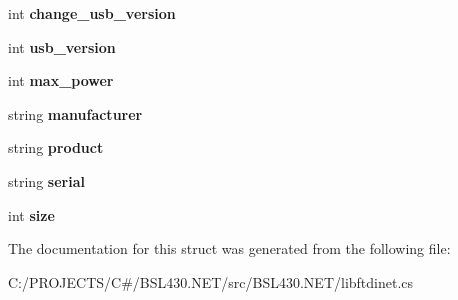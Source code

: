 \begin{DoxyCompactItemize}
int {\bfseries change\+\_\+usb\+\_\+version}
\item 
\mbox{\label{structlibftdinet_1_1ftdi__eeprom_a6b5046d7b6ed9dce4349c097d8554bc6}} 
int {\bfseries usb\+\_\+version}
\item 
\mbox{\label{structlibftdinet_1_1ftdi__eeprom_acb1695d25aba40e0a7f08085e620d5eb}} 
int {\bfseries max\+\_\+power}
\item 
\mbox{\label{structlibftdinet_1_1ftdi__eeprom_a097cd6cb98a7950a6ae847bd2f7641db}} 
string {\bfseries manufacturer}
\item 
\mbox{\label{structlibftdinet_1_1ftdi__eeprom_ac5adb9a236be5b92ab54cdc2ad74884a}} 
string {\bfseries product}
\item 
\mbox{\label{structlibftdinet_1_1ftdi__eeprom_a400ff6e7d05f656644b6139fd400577b}} 
string {\bfseries serial}
\item 
\mbox{\label{structlibftdinet_1_1ftdi__eeprom_a9d5e936ecbe8e7316696edfc5a246a71}} 
int {\bfseries size}
\end{DoxyCompactItemize}


The documentation for this struct was generated from the following file\+:\begin{DoxyCompactItemize}
\item 
C\+:/\+P\+R\+O\+J\+E\+C\+T\+S/\+C\#/\+B\+S\+L430.\+N\+E\+T/src/\+B\+S\+L430.\+N\+E\+T/libftdinet.\+cs\end{DoxyCompactItemize}
